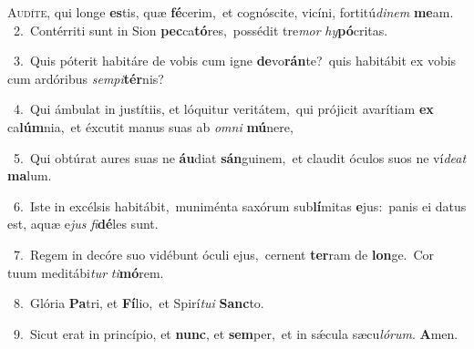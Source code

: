\lettrine{\initial\textcolor{\initialcolor}{A}}{udíte,} qui longe \textbf{es}\-tis, quæ \textbf{fé}\-cerim,~\star et cognóscite, vicíni, fortitú\-\textit{di}\-\textit{nem} \textbf{me}\-am.\\
{\numbfont\textcolor{\numbcolor}{~2.}}~Contérriti sunt in Sion \textbf{pec}\-ca\-\textbf{tó}\-res,~\star possédit tre\textit{mor} \textit{hy}\-\textbf{pó}critas.\par
{\numbfont\textcolor{\numbcolor}{~3.}}~Quis póterit habitáre de vobis cum igne \textbf{de}\-vo\-\textbf{rán}\-te?~\star quis habitábit ex vobis cum ardóribus \textit{sem}\-\textit{pi}\textbf{tér}nis?\par
{\numbfont\textcolor{\numbcolor}{~4.}}~Qui ámbulat in justítiis, et lóquitur veritátem,~\dagger qui prójicit avarítiam \textbf{ex} ca\-\textbf{lúm}\-nia,~\star et éxcutit manus suas ab \textit{om}\-\textit{ni} \textbf{mú}\-nere,\par
{\numbfont\textcolor{\numbcolor}{~5.}}~Qui obtúrat aures suas ne \textbf{áu}\-diat \textbf{sán}\-guinem,~\star et claudit óculos suos ne ví\-\textit{de}\-\textit{at} \textbf{ma}\-lum.\par
{\numbfont\textcolor{\numbcolor}{~6.}}~Iste in excélsis habitábit,~\dagger muniménta saxórum sub\-\textbf{lí}\-mitas \textbf{e}\-jus:~\star panis ei datus est, aquæ e\textit{jus} \textit{fi}\-\textbf{dé}les sunt.\par
{\numbfont\textcolor{\numbcolor}{~7.}}~Regem in decóre suo vidébunt óculi ejus,~\dagger cernent \textbf{ter}\-ram de \textbf{lon}\-ge.~\star Cor tuum meditábi\textit{tur} \textit{ti}\-\textbf{mó}rem.\par
{\numbfont\textcolor{\numbcolor}{~8.}}~Glória \textbf{Pa}\-tri, et \textbf{Fí}\-lio,~\star et Spirí\-\textit{tu}\-\textit{i} \textbf{Sanc}\-to.\par
{\numbfont\textcolor{\numbcolor}{~9.}}~Sicut erat in princípio, et \textbf{nunc}\-, et \textbf{sem}\-per,~\star et in sǽcula sæcu\-\textit{ló}\-\textit{rum}. \textbf{A}\-men.\par
